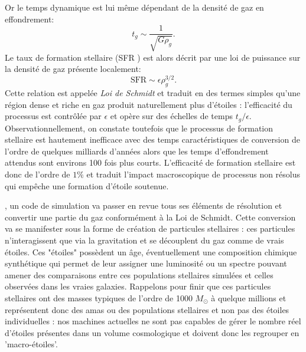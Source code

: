Or le temps dynamique est lui même dépendant de la densité de gaz en effondrement:
\begin{equation}
t_g\sim\frac{1}{\sqrt{G\rho_g}}.
\end{equation}
Le taux de formation stellaire (SFR ) est alors décrit par une loi de puissance sur la densité de gaz présente localement:
\begin{equation}
\mathrm{SFR}\sim \epsilon \rho_g^{3/2}.
\label{e:schmidt}
\end{equation}
Cette relation est appelée \textit{Loi de Schmidt} et traduit en des termes simples qu'une région dense et riche en gaz produit naturellement plus d'étoiles : l'efficacité du processus est contrôlée par $\epsilon$ et opère sur des échelles de temps $t_g/\epsilon$. Observationnellement, on constate toutefois que le processus de formation stellaire est hautement inefficace avec des temps caractéristiques de conversion de l'ordre de quelques milliards d'années alors que les temps d'effondrement attendus sont environs 100 fois plus courts. L'efficacité de formation stellaire est donc de l'ordre de $1\%$ et traduit l'impact macroscopique de processus non résolus qui empêche une formation d'étoile soutenue.

, un code de simulation va passer en revue tous ses éléments de résolution et convertir une partie du gaz conformément à la Loi de Schmidt. Cette conversion va se manifester sous la forme de création de particules stellaires : ces particules n'interagissent que via la gravitation et se découplent du gaz comme de vrais étoiles. Ces "étoiles" possèdent un âge, éventuellement une composition chimique synthétique qui permet de leur assigner une luminosité ou un spectre pouvant amener des comparaisons entre ces populations stellaires simulées et celles observées dans les vraies galaxies. Rappelons pour finir que ces particules stellaires ont des masses typiques de l'ordre de 1000 $M_\odot$ à quelque millions et représentent donc des amas ou des populations stellaires et non pas des étoiles individuelles : nos machines actuelles ne sont pas capables de gérer le nombre réel d'étoiles présentes dans un volume cosmologique et doivent donc les regrouper en 'macro-étoiles'.

